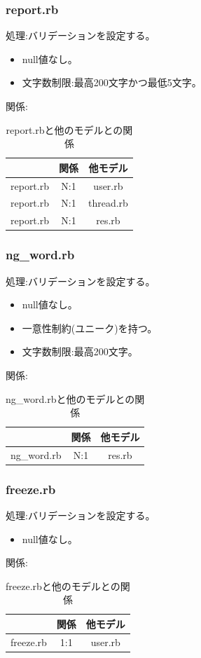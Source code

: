 \documentclass[a4j]{jarticle}
\begin{document}
\subsubsection{report.rb}
\noindent
処理:バリデーションを設定する。
\begin{itemize}
  \item null値なし。
  \item 文字数制限:最高200文字かつ最低5文字。
  \end{itemize}
関係:
\begin{table}[H]
  \centering
  \caption{report.rbと他のモデルとの関係}
  \begin{tabular}{|c|c|c|}\hline
    & 関係 & 他モデル\\ \hline \hline
    report.rb & N:1 & user.rb \\ \hline
    report.rb & N:1 & thread.rb \\ \hline
    report.rb & N:1 & res.rb \\ \hline
  \end{tabular}
\end{table}

\subsubsection{ng\_word.rb}
\noindent
処理:バリデーションを設定する。
\begin{itemize}
  \item null値なし。
  \item 一意性制約(ユニーク)を持つ。
  \item 文字数制限:最高200文字。
\end{itemize}
関係:
\begin{table}[H]
  \centering
  \caption{ng\_word.rbと他のモデルとの関係}
  \begin{tabular}{|c|c|c|}\hline
    & 関係 & 他モデル\\ \hline \hline
    ng\_word.rb & N:1 & res.rb \\ \hline
  \end{tabular}
\end{table}


\subsubsection{freeze.rb}
\noindent
処理:バリデーションを設定する。
\begin{itemize}
  \item null値なし。
\end{itemize}
関係:
\begin{table}[H]
  \centering
  \caption{freeze.rbと他のモデルとの関係}
  \begin{tabular}{|c|c|c|}\hline
    & 関係 & 他モデル\\ \hline \hline
    freeze.rb & 1:1 & user.rb \\ \hline
  \end{tabular}
\end{table}



\appendix
\end{document}
